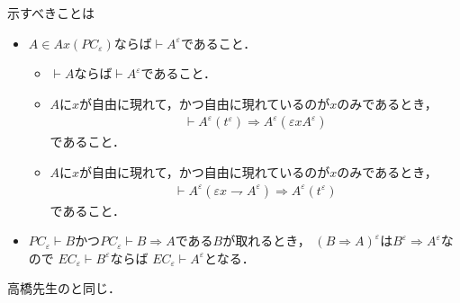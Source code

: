 	示すべきことは
	\begin{itemize}
		\item $A \in Ax(PC_{\varepsilon})$ならば$\vdash A^{\varepsilon}$であること．
			\begin{itemize}
				\item $\vdash A$ならば$\vdash A^{\varepsilon}$であること．
				\item $A$に$x$が自由に現れて，かつ自由に現れているのが$x$のみであるとき，
					\begin{align}
						\vdash A^{\varepsilon}(t^{\varepsilon}) \Longrightarrow A^{\varepsilon}(\varepsilon x A^{\varepsilon})
					\end{align}
					であること．
				\item $A$に$x$が自由に現れて，かつ自由に現れているのが$x$のみであるとき，
					\begin{align}
						\vdash A^{\varepsilon}(\varepsilon x \rightharpoondown A^{\varepsilon}) \Longrightarrow A^{\varepsilon}(t^{\varepsilon})
					\end{align}
					であること．
			\end{itemize}
		
		\item $PC_{\varepsilon} \vdash B$かつ$PC_{\varepsilon} \vdash B \Longrightarrow A$である$B$が取れるとき，
			$(B \Longrightarrow A)^{\varepsilon}$は$B^{\varepsilon} \Longrightarrow A^{\varepsilon}$なので
			$EC_{\varepsilon} \vdash B^{\varepsilon}$ならば
			$EC_{\varepsilon} \vdash A^{\varepsilon}$となる．
	\end{itemize}
	
	\begin{screen}
		\begin{thm}[置換補題]
			高橋先生のと同じ．
		\end{thm}
	\end{screen}
	
